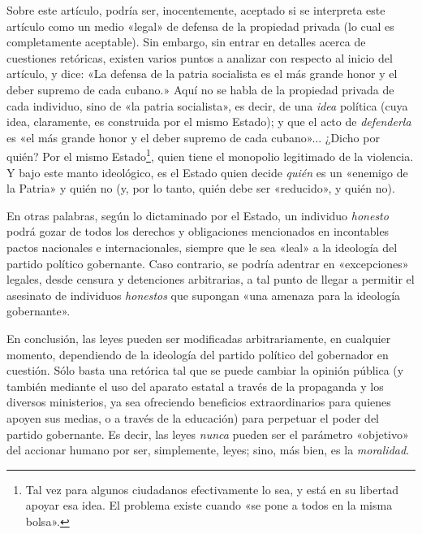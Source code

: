 \documentclass[12pt,a4paper,twoside]{book}
\begin{document}
Sobre este artículo, podría ser, inocentemente, aceptado si se interpreta este artículo como un medio «legal» de defensa de la propiedad privada (lo cual es completamente aceptable). Sin embargo, sin entrar en detalles acerca de cuestiones retóricas, existen varios puntos a analizar con respecto al inicio del artículo, y dice: «La defensa de la patria socialista es el más grande honor y el deber supremo de cada cubano.» Aquí no se habla de la propiedad privada de cada individuo, sino de «la patria socialista», es decir, de una \textit{idea} política (cuya idea, claramente, es construida por el mismo Estado); y que el acto de \textit{defenderla} es «el más grande honor y el deber supremo de cada cubano»... ¿Dicho por quién? Por el mismo Estado\footnote{Tal vez para algunos ciudadanos efectivamente lo sea, y está en su libertad apoyar esa idea. El problema existe cuando «se pone a todos en la misma bolsa».}, quien tiene el monopolio legitimado de la violencia. Y bajo este manto ideológico, es el Estado quien decide \textit{quién} es un «enemigo de la Patria» y quién no (y, por lo tanto, quién debe ser «reducido», y quién no).

En otras palabras, según lo dictaminado por el Estado, un individuo \textit{honesto} podrá gozar de todos los derechos y obligaciones mencionados en incontables pactos nacionales e internacionales, siempre que le sea «leal» a la ideología del partido político gobernante. Caso contrario, se podría adentrar en «excepciones» legales, desde censura y detenciones arbitrarias, a tal punto de llegar a permitir el asesinato de individuos \textit{honestos} que supongan «una amenaza para la ideología gobernante».

En conclusión, las leyes pueden ser modificadas arbitrariamente, en cualquier momento, dependiendo de la ideología del partido político del gobernador en cuestión. Sólo basta una retórica tal que se puede cambiar la opinión pública (y también mediante el uso del aparato estatal a través de la propaganda y los diversos ministerios, ya sea ofreciendo beneficios extraordinarios para quienes apoyen sus medias, o a través de la educación) para perpetuar el poder del partido gobernante. Es decir, las leyes \textit{nunca} pueden ser el parámetro «objetivo» del accionar humano por ser, simplemente, leyes; sino, más bien, es la \textit{moralidad}.
\end{document}
